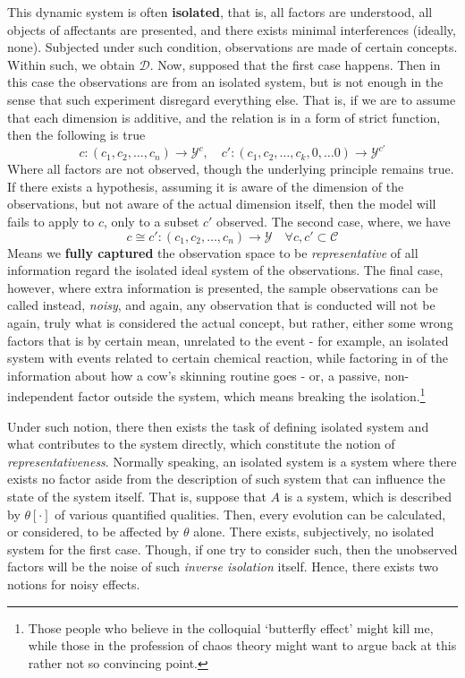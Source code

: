\documentclass{article}
\begin{document}
This dynamic system is often \textbf{isolated}, that is, all factors are understood, all objects of affectants are presented, and there exists minimal interferences (ideally, none). Subjected under such condition, observations are made of certain concepts. Within such, we obtain $\mathcal{D}$. Now, supposed that the first case happens. Then in this case the observations are from an isolated system, but is not enough in the sense that such experiment disregard everything else. That is, if we are to assume that each dimension is additive, and the relation is in a form of strict function, then the following is true
\begin{equation}
    c: (c_1, c_2,\dots,c_n) \to \mathcal{Y}^{c}, \quad c': (c_1,c_2,\dots,c_{k},0,\dots0)\to \mathcal{Y}^{c'}
\end{equation}
Where all factors are not observed, though the underlying principle remains true. If there exists a hypothesis, assuming it is aware of the dimension of the observations, but not aware of the actual dimension itself, then the model will fails to apply to $c$, only to a subset $c'$ observed. The second case, where, we have
\begin{equation}
    c \cong c': (c_1, c_2,\dots,c_n) \to \mathcal{Y} \quad \forall c,c'\subset \mathcal{C}
\end{equation}
Means we \textbf{fully captured} the observation space to be \textit{representative} of all information regard the isolated ideal system of the observations. The final case, however, where extra information is presented, the sample observations can be called instead, \textit{noisy}, and again, any observation that is conducted will not be again, truly what is considered the actual concept, but rather, either some wrong factors that is by certain mean, unrelated to the event - for example, an isolated system with events related to certain chemical reaction, while factoring in of the information about how a cow's skinning routine goes - or, a passive, non-independent factor outside the system, which means breaking the isolation.\footnote{Those people who believe in the colloquial `butterfly effect' might kill me, while those in the profession of chaos theory might want to argue back at this rather not so convincing point.}

Under such notion, there then exists the task of defining isolated system and what contributes to the system directly, which constitute the notion of \textit{representativeness}. Normally speaking, an isolated system is a system where there exists no factor aside from the description of such system that can influence the state of the system itself. That is, suppose that $A$ is a system, which is described by $\theta[\cdot]$ of various quantified qualities. Then, every evolution can be calculated, or considered, to be affected by $\theta$ alone. There exists, subjectively, no isolated system for the first case. Though, if one try to consider such, then the unobserved factors will be the noise of such \textit{inverse isolation} itself. Hence, there exists two notions for noisy effects. 
\end{document}
